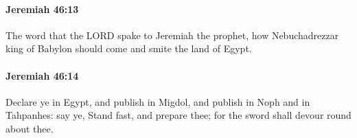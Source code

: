 		\paragraph{Jeremiah 46:13} %
			\label{JEREMIAH-46-13}

			The word that the LORD spake to Jeremiah the prophet, how Nebuchadrezzar king of Babylon should come and smite the land of Egypt.


		\paragraph{Jeremiah 46:14} %
			\label{JEREMIAH-46-14}

			Declare ye in Egypt, and publish in Migdol, and publish in Noph and in Tahpanhes: say ye, Stand fast, and prepare thee; for the sword shall devour round about thee.


